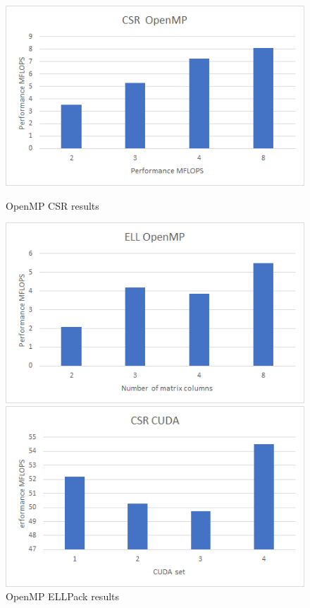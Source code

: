 \documentclass{scrreprt}
\begin{document}
\begin{figure}[ht] 
  \label{ fig7} 
  \begin{minipage}[b]{0.5\linewidth}
    \centering
    \includegraphics[width=.9\linewidth]{mcfeCSRMP.png} 
    \caption{OpenMP CSR results} 
    \vspace{4ex}
  \end{minipage}%
  \begin{minipage}[b]{0.5\linewidth}
    \centering
    \includegraphics[width=.9\linewidth]{mcfeELLMP.png} 
    \caption{OpenMP ELLPack results} 
    \vspace{4ex}
  \end{minipage} 
  \begin{minipage}[b]{0.5\linewidth}
    \centering
    \includegraphics[width=.9\linewidth]{mcfeCSRCUDA.png} 

\end{minipage}
\end{figure}
\end{document}
